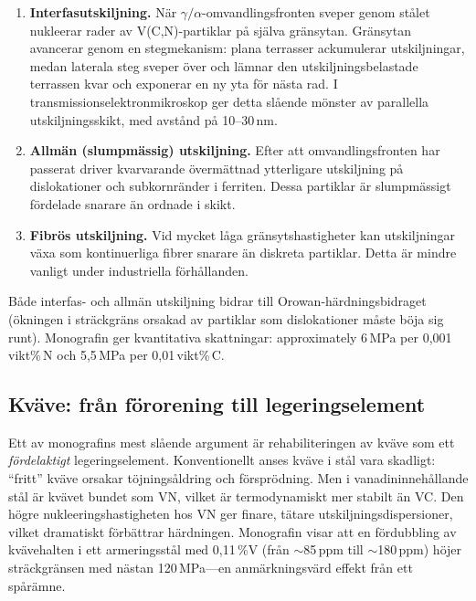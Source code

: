 \documentclass[11pt,a4paper]{article}
\begin{document}
\begin{enumerate}
  \item \textbf{Interfasutskiljning.}  N\"ar
    $\gamma/\alpha$-omvandlingsfronten sveper genom st\aa{}let
    nukleerar rader av V(C,N)-partiklar p\aa{} sj\"alva gr\"ansytan.
    Gr\"ansytan avancerar genom en stegmekanism: plana terrasser
    ackumulerar utskiljningar, medan laterala steg sveper \"over och
    l\"amnar den utskiljningsbelastade terrassen kvar och exponerar en
    ny yta f\"or n\"asta rad.  I transmissionselektronmikroskop ger
    detta sl\aa{}ende m\"onster av parallella utskiljningsskikt,
    med avst\aa{}nd p\aa{} 10--30\,nm.

  \item \textbf{Allm\"an (slumpm\"assig) utskiljning.}  Efter att
    omvandlingsfronten har passerat driver kvarvarande \"overm\"attnad
    ytterligare utskiljning p\aa{} dislokationer och subkornr\"ander i
    ferriten.  Dessa partiklar \"ar slumpm\"assigt f\"ordelade snarare
    \"an ordnade i skikt.

  \item \textbf{Fibr\"os utskiljning.}  Vid mycket l\aa{}ga
    gr\"ansytshastigheter kan utskiljningar v\"axa som kontinuerliga
    fibrer snarare \"an diskreta partiklar.  Detta \"ar mindre vanligt
    under industriella f\"orh\aa{}llanden.
\end{enumerate}

B\aa{}de interfas- och allm\"an utskiljning bidrar till
Orowan-h\"ardningsbidraget (\"okningen i str\"ackgr\"ans orsakad av
partiklar som dislokationer m\aa{}ste b\"oja sig runt).  Monografin ger
kvantitativa skattningar: approximately 6\,MPa per 0,001\,vikt\%\,N
och 5,5\,MPa per 0,01\,vikt\%\,C.

\subsection{Kv\"ave: fr\aa{}n f\"ororening till legeringselement}

Ett av monografins mest sl\aa{}ende argument \"ar rehabiliteringen av
kv\"ave som ett \emph{f\"ordelaktigt} legeringselement.  Konventionellt
anses kv\"ave i st\aa{}l vara skadligt: ``fritt'' kv\"ave orsakar
t\"ojnings\aa{}ldring och f\"orspr\"odning.  Men i vanadininneh\aa{}llande
st\aa{}l \"ar kv\"avet bundet som VN, vilket \"ar termodynamiskt mer
stabilt \"an VC.  Den h\"ogre nukleeringshastigheten hos VN ger finare,
t\"atare utskiljningsdispersioner, vilket dramatiskt f\"orb\"attrar
h\"ardningen.  Monografin visar att en f\"ordubbling av kv\"avehalten i
ett armeringsst\aa{}l med 0,11\,\%V (fr\aa{}n $\sim$85\,ppm till
$\sim$180\,ppm) h\"ojer str\"ackgr\"ansen med n\"astan
120\,MPa---en anm\"arkningsv\"ard effekt fr\aa{}n ett sp\aa{}r\"amne.
\end{document}
